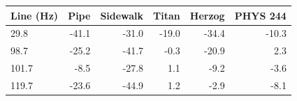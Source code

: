\begin{tabular}{lrrrrr}
\toprule
Line (Hz) & Pipe & Sidewalk & Titan & Herzog & PHYS 244 \\
\midrule
29.8 & -41.1 & -31.0 & -19.0 & -34.4 & -10.3 \\
98.7 & -25.2 & -41.7 & -0.3 & -20.9 & 2.3 \\
101.7 & -8.5 & -27.8 & 1.1 & -9.2 & -3.6 \\
119.7 & -23.6 & -44.9 & 1.2 & -2.9 & -8.1 \\
\bottomrule
\end{tabular}
